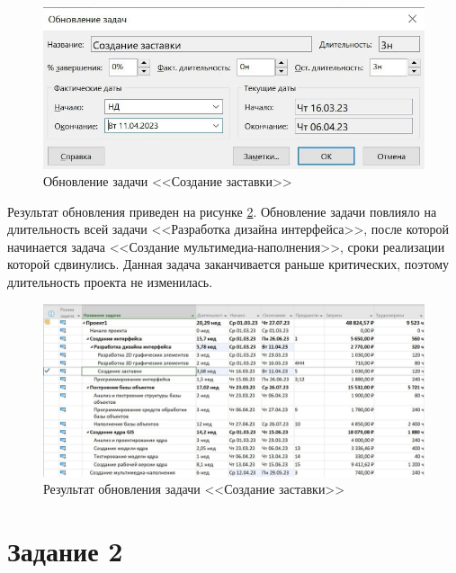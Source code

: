 \begin{figure}[H]
	\begin{center}
		\includegraphics[scale=0.3]{inc/img/task1.jpg}
	\end{center}
	\captionsetup{justification=centering}
	\caption{Обновление задачи <<Создание заставки>>}
	\label{img:task1}
\end{figure}

Результат обновления приведен на рисунке \ref{img:task1-result}. Обновление задачи повлияло на длительность всей задачи <<Разработка дизайна интерфейса>>, после которой начинается задача <<Создание мультимедиа-наполнения>>, сроки реализации которой сдвинулись. Данная задача заканчивается раньше критических, поэтому длительность проекта не изменилась.

\begin{figure}[H]
	\begin{center}
		\includegraphics[scale=0.25]{inc/img/task1-result.jpg}
	\end{center}
	\captionsetup{justification=centering}
	\caption{Результат обновления задачи <<Создание заставки>>}
	\label{img:task1-result}
\end{figure}

\section*{Задание 2}


